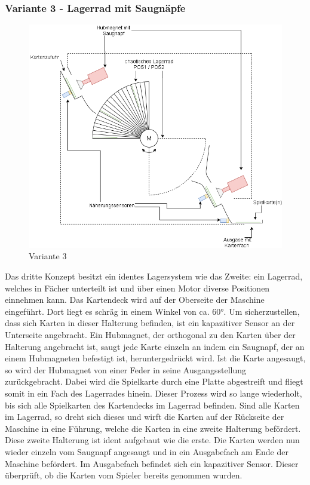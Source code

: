 \subsubsection{Variante 3 - Lagerrad mit Saugnäpfe}

\begin{figure}[H]
    \centering
    \includegraphics[scale=0.6,page=1]{fig/mech/AufbauReshuffledV3}
    \caption{Variante 3}
\end{figure}

Das dritte Konzept besitzt ein identes Lagersystem wie das Zweite: ein Lagerrad, welches in Fächer unterteilt ist und über einen Motor diverse Positionen einnehmen kann.
Das Kartendeck wird auf der Oberseite der Maschine eingeführt. Dort liegt es schräg in einem Winkel von ca. 60°. Um sicherzustellen, dass sich Karten in dieser Halterung befinden,
ist ein kapazitiver Sensor an der Unterseite angebracht.
Ein Hubmagnet, der orthogonal zu den Karten über der Halterung angebracht ist, saugt jede Karte einzeln an indem ein Saugnapf, der an einem Hubmagneten
befestigt ist, heruntergedrückt wird. Ist die Karte angesaugt, so wird der Hubmagnet von einer Feder in seine Ausgangsstellung zurückgebracht.
Dabei wird die Spielkarte durch eine Platte abgestreift und fliegt somit in ein Fach des
Lagerrades hinein. Dieser Prozess wird so lange wiederholt, bis sich alle Spielkarten des Kartendecks im Lagerrad befinden.
Sind alle Karten im Lagerrad, so dreht sich dieses und wirft die Karten auf der Rückseite der Maschine in eine Führung, welche die Karten in eine zweite Halterung befördert.
Diese zweite Halterung ist ident aufgebaut wie die erste.
Die Karten werden nun wieder einzeln vom Saugnapf angesaugt und in ein Ausgabefach am Ende der Maschine befördert. Im Ausgabefach befindet sich
ein kapazitiver Sensor. Dieser überprüft, ob die Karten vom Spieler bereits genommen wurden.\\

